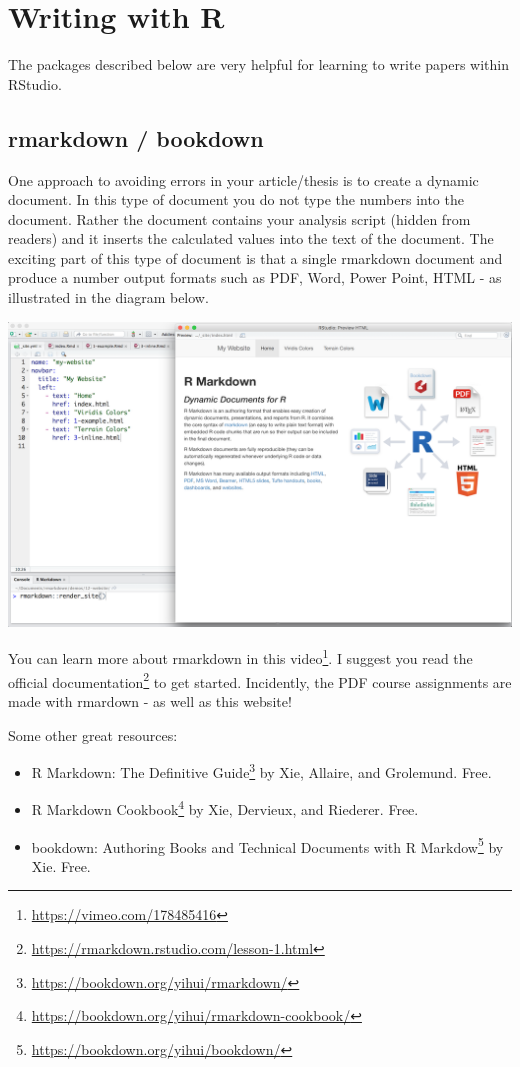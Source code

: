 \documentclass[
]{krantz}
\renewcommand{\href}[2]{#2\footnote{\url{#1}}}
\begin{document}
\hypertarget{writing-with-r}{%
\section{Writing with R}\label{writing-with-r}}

The packages described below are very helpful for learning to write papers within RStudio.

\hypertarget{rmarkdown-bookdown}{%
\subsection{rmarkdown / bookdown}\label{rmarkdown-bookdown}}

One approach to avoiding errors in your article/thesis is to create a dynamic document. In this type of document you do not type the numbers into the document. Rather the document contains your analysis script (hidden from readers) and it inserts the calculated values into the text of the document. The exciting part of this type of document is that a single rmarkdown document and produce a number output formats such as PDF, Word, Power Point, HTML - as illustrated in the diagram below.

\includegraphics[width=0.6\linewidth]{ch_tools/images/rmarkdown_docs}

You can learn more about rmarkdown in this \href{https://vimeo.com/178485416}{video}. I suggest you read the official \href{https://rmarkdown.rstudio.com/lesson-1.html}{documentation} to get started. Incidently, the PDF course assignments are made with rmardown - as well as this website!

Some other great resources:

\begin{itemize}
\item
  \href{https://bookdown.org/yihui/rmarkdown/}{R Markdown: The Definitive Guide} by Xie, Allaire, and Grolemund. Free.
\item
  \href{https://bookdown.org/yihui/rmarkdown-cookbook/}{R Markdown Cookbook} by Xie, Dervieux, and Riederer. Free.
\item
  \href{https://bookdown.org/yihui/bookdown/}{bookdown: Authoring Books and Technical Documents with R Markdow} by Xie. Free.
\end{itemize}
\end{document}
